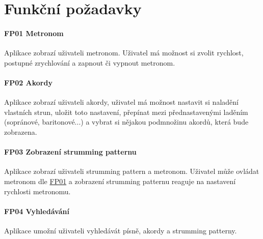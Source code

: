 \section{Funkční požadavky}
\label{sc:functional_req}

\noindent \begin{minipage}{\textwidth}
    \paragraph{FP01 Metronom} \label{FP01}
    \begin{smallindent}{}
        Aplikace zobrazí uživateli metronom. Uživatel má možnost si zvolit rychlost, postupné zrychlování a zapnout či vypnout metronom.
    \end{smallindent}
\end{minipage}

\noindent \begin{minipage}{\textwidth}
    \paragraph{FP02 Akordy} \label{FP02}
    \begin{smallindent}{}
        Aplikace zobrazí uživateli akordy, uživatel má možnost nastavit si naladění vlastních strun, uložit toto nastavení, přepínat mezi přednastavenými laděním (sopránové, baritonové...) a vybrat si nějakou podmnožinu akordů, která bude zobrazena.
    \end{smallindent}
\end{minipage}

\noindent \begin{minipage}{\textwidth}
    \paragraph{FP03 Zobrazení strumming patternu} \label{FP03}
    \begin{smallindent}{}
        Aplikace zobrazí uživateli strumming pattern a metronom. Uživatel může ovládat metronom dle \hyperref[FP01]{FP01} a zobrazení strumming patternu reaguje na nastavení rychlosti metronomu.
    \end{smallindent}
\end{minipage}

\noindent \begin{minipage}{\textwidth}
    \paragraph{FP04 Vyhledávání} \label{FP04}
    \begin{smallindent}{}
        Aplikace umožní uživateli vyhledávát písně, akordy a strumming patterny.
    \end{smallindent}
\end{minipage}

